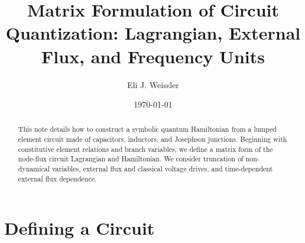 \documentclass[10pt,aps,pra,onecolumn,superscriptaddress,floatfix,nofootinbib]{revtex4-2}
\begin{document}
\hfuzz=150pt

\title{Matrix Formulation of Circuit Quantization: Lagrangian, External Flux, and Frequency Units}

\author{Eli J. Weissler}

\date{\today}

\begin{abstract}
This note details how to construct a symbolic quantum Hamiltonian from a lumped element circuit made of capacitors, inductors, and Josephson junctions. Beginning with constitutive element relations and branch variables, we define a matrix form of the node-flux circuit Lagrangian and Hamiltonian. We consider truncation of non-dynamical variables, external flux and classical voltage drives, and time-dependent external flux dependence.
\end{abstract}
\maketitle

\tableofcontents

\newpage
\section{Defining a Circuit}\label{circuit_def}
\end{document}
